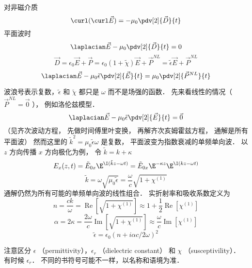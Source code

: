 
对非磁介质
\begin{equation}
  \curl (\curl \vec E) =  - {\mu _0} \pdv[2]{\vec D}{t}
 \end{equation}
平面波时
 \begin{equation}
  {\laplacian}\vec E - {\mu _0} \pdv[2]{\vec D}{t} = 0
 \end{equation}
 \begin{equation}
\vec D = {\epsilon _0}\vec E + \vec P = {\epsilon _0}(1 + \tilde \chi )\vec E + {\vec P^{NL}} = \tilde \epsilon \vec E + {\vec P^{NL}}
 \end{equation}
 \begin{equation}
{\laplacian}\vec E - {\mu _0}\tilde \epsilon \pdv[2]{\vec E}{t} = {\mu _0} \pdv[2]{\vec P^{NL}}{t}
 \end{equation}
 
波浪号表示复数，$\tilde \epsilon$ 和 $\tilde \chi $ 都只是 $\omega $ 而不是场强的函数． 先来看线性的情况（ ${\vec P^{NL}} = \vec 0$ ）， 例如洛伦兹模型．
\begin{equation}
{\laplacian}\vec E - {\mu _0}\tilde \epsilon \pdv[2]{\vec E}{t} = \vec 0
 \end{equation}
（见齐次波动方程， 先做时间傅里叶变换， 再解齐次亥姆霍兹方程， 通解是所有平面波） 然而这里的 ${\tilde k^2} = {\mu _0}\tilde \epsilon \omega$ 是复数， 平面波变为指数衰减的单频单向波． 以 $z$ 方向传播 $x$ 方向极化为例， 令  $\tilde k = k + \kappa $ 
\begin{equation}
{E_x}(z,t) = {\tilde E_{0x}}{\E^{\I(\tilde kz - \omega t)}} = {\tilde E_{0x}}{\E^{ - \kappa z}}{\E^{\I(kz - \omega t)}}
\end{equation}
\begin{equation}
\tilde k = \omega \sqrt {{\mu _0}\tilde \epsilon }  = \frac{\omega }{c}\sqrt {1 + {\chi ^{(1)}}}
\end{equation}
通解仍然为所有可能的单频单向波的线性组合． 实折射率和吸收系数定义为
\begin{equation}
n = \frac{{ck}}{\omega } = \operatorname{Re} \left[ {\sqrt {1 + {\chi ^{(1)}}} } \right] \approx 1 + \frac{1}{2}\operatorname{Re} [{\chi ^{(1)}}]
\end{equation}
\begin{equation}
\alpha  = 2\kappa  = \frac{{2\omega }}{c}\operatorname{Im} \left[ {\sqrt {1 + {\chi ^{(1)}}} } \right] \approx \frac{\omega }{c}\operatorname{Im} [{\chi ^{(1)}}]
\end{equation}
\begin{equation}
\tilde \epsilon  = {\epsilon _0}{(n + i\alpha c/2\omega )^2}
\end{equation}
 
注意区分 $\epsilon$ 
（permittivity），${\epsilon _r}$ （dielectric constant） 和 $\chi $ （susceptivility）． 有时候 ${\epsilon _r}$． 不同的书符号可能不一样，以名称和语境为准．

